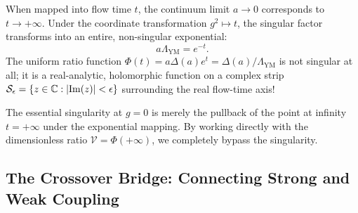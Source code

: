 When mapped into flow time $t$, the continuum limit $a \to 0$ corresponds to $t \to +\infty$. Under the coordinate transformation $g^2 \mapsto t$, the singular factor transforms into an entire, non-singular exponential:
\begin{equation}
a \Lambda_{\mathrm{YM}} = e^{-t}.
\end{equation}
The uniform ratio function $\Phi(t) = a \Delta(a) e^t = \Delta(a)/\Lambda_{\mathrm{YM}}$ is not singular at all; it is a real-analytic, holomorphic function on a complex strip $\mathcal{S}_\epsilon = \{ z \in \mathbb{C} : |\mathrm{Im}(z)| < \epsilon \}$ surrounding the real flow-time axis! 

The essential singularity at $g = 0$ is merely the pullback of the point at infinity $t = +\infty$ under the exponential mapping. By working directly with the dimensionless ratio $\mathcal{V} = \Phi(+\infty)$, we completely bypass the singularity.

\subsection{The Crossover Bridge: Connecting Strong and Weak Coupling}
\label{subsec:crossover_bridge_summary}

